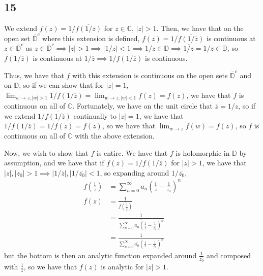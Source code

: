 \documentclass[12pt,letterpaper]{article}
\theoremstyle{definition}
\newcommand{\D}{\mathbb{D}}
\newcommand{\C}{\mathbb{C}}
\begin{document}
\subsection*{15}

We extend $f(z) = 1/\overline{f(1/\overline{z})}$ for $z \in \C$, $|z| > 1$. Then, we have that on the open set $\overline{\D}^{c}$ where this extension is defined, $f(z) = 1/\overline{f(1/\overline{z})}$ is continuous at $z \in \overline{\D}^{c}$ as $z \in \overline{\D}^{c} \implies |z| > 1 \implies |1/z| < 1 \implies 1/z \in \D \implies \overline{1/z} = 1/\overline{z}\in \D$, so $f(1/\overline{z})$ is continuous at $1/\overline{z}\implies 1/\overline{f(1/\overline{z})}$ is continuous.

Thus, we have that $f$ with this extension is continuous on the open sets $\overline{\D}^{c}$ and on $\D$, so if we can show that for $|z| = 1$, $\lim_{w \rightarrow z, |w| > 1}1/\overline{f(1/\overline{z})} = \lim_{w \rightarrow z, |w| < 1}f(z) = f(z)$, we have that $f$ is continuous on all of $\C$. Fortunately, we have on the unit circle that $\overline{z} = 1/z$, so if we extend $1/\overline{f(1/\overline{z})}$ continually to $|z| = 1$, we have that $1/\overline{f(1/\overline{z})} = 1/\overline{f(z)} = f(z)$, so we have that $\lim_{w \rightarrow z}f(w) = f(z)$, so $f$ is continuous on all of $\C$ with the above extension.

Now, we wish to show that $f$ is entire. We have that $f$ is holomorphic in $\D$ by assumption, and we have that if $f(z) = 1/\overline{f(1/\overline{z})}$ for $|z| > 1$, we have that $|z|, |z_{0}| > 1 \implies |1/\overline{z}|, |1/\overline{z_{0}}| < 1$, so expanding around $1/\overline{z_{0}}$,
\begin{align*}
  f\left(\frac{1}{\overline{z}}\right) &= \sum_{n=0}^{\infty}a_{n}\left(\frac{1}{\overline{z}} - \frac{1}{\overline{z_{0}}}\right)^{n} \\
  f(z) &= \frac{1}{\overline{f\left(\frac{1}{\overline{z}}\right)}} \\
                                       &= \frac{1}{\overline{\sum_{n=0}^{\infty}a_{n}\left(\frac{1}{\overline{z}} - \frac{1}{\overline{z_{0}}}\right)^{n}}} \\
                                       &= \frac{1}{\sum_{n=0}^{\infty}\overline{a_{n}}\left(\frac{1}{z} - \frac{1}{z_{0}}\right)^{n}}
\end{align*}
but the bottom is then an analytic function expanded around $\frac{1}{z_{0}}$ and composed with $\frac{1}{z}$, so we have that $f(z)$ is analytic for $|z| > 1$.
\end{document}
